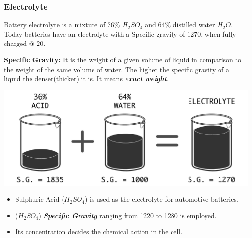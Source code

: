 \documentclass{beamer}
\begin{document}
\begin{frame}    %
  \frametitle{Electrolyte}
  \fontsize{7pt}{10}\selectfont
  
  \begin{center}
    Battery electrolyte is a mixture of 36\% $H_{2}SO_{4}$ and 64\% distilled water $H_{2}O$. \\ Today batteries
    have an electrolyte with a Specific gravity of 1270, when fully charged @ 20\textcelsius.
  \end{center}
  
  \textbf{Specific Gravity:} It is the weight of a given volume of liquid in comparison to the weight of the same
  volume of water. The higher the specific gravity of a liquid the denser(thicker) it is. It means \textbf{\textit{exact weight}}.
  
  \vspace{-10pt}
  \begin{center}
    \includegraphics[width=0.7\linewidth]{./Resources/Images/Specific_Gravity.pdf}
  \end{center}

  \vspace{-10pt}  
  \begin{itemize}
    \item Sulphuric Acid ($H_{2}SO_{4}$) is used as the electrolyte for automotive batteries.
    \item ($H_{2}SO_{4}$) \textbf{\textit{Specific Gravity}} ranging from 1220 to 1280 is employed.
    \item Its concentration decides the chemical action in the cell.
  \end{itemize}
\end{frame}
\end{document}
